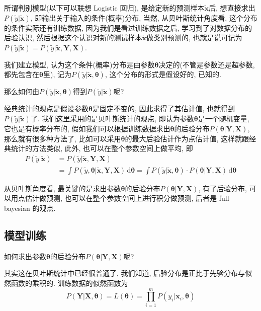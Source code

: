 \documentclass[a4paper,UTF8]{ctexart}
\theoremstyle{plain} \newtheorem{theorem}{定理}[section]
\theoremstyle{plain} \newtheorem{definition}{定义}[section]
\theoremstyle{plain} \newtheorem{lemma}{引理}[section]
\theoremstyle{plain} \newtheorem{proposition}{命题}[section]
\theoremstyle{plain} \newtheorem{example}{例}[section]
\theoremstyle{plain} \newtheorem{remark}{注}[section]
\theoremstyle{plain} \newtheorem{corollary}{推论}[section]
\newcommand\diff{\,{\mathrm d}} %
\begin{document}
所谓判别模型(以下可以联想 Logistic 回归), 是给定新的预测样本$\tilde{\bm{x}}$后, 想直接求出$P(\tilde{y} | \tilde{\bm{x}})$, 即输出关于输入的条件(概率)分布, 当然, 从贝叶斯统计角度看, 这个分布的条件实际还有训练数据, 因为我们是看过训练数据之后, 学习到了对数据分布的后验认识, 然后根据这个认识对新的测试样本$\tilde{\bm{x}}$做类别预测的, 也就是说可记为$P(\tilde{y} | \tilde{\bm{x}}) = P(\tilde{y} | \tilde{\bm{x}}, \bm{Y}, \bm{X})$.

我们建立模型, 认为这个条件(概率)分布是由参数$\bm{\theta}$决定的(不管是参数还是超参数, 都先包含在$\bm{\theta}$里), 记为$P(\tilde{y} | \tilde{\bm{x}}, \bm{\theta})$, 这个分布的形式是假设好的, 已知的.

那么如何由$P(\tilde{y} | \tilde{\bm{x}}, \bm{\theta})$得到$P(\tilde{y} | \tilde{\bm{x}})$呢? 

经典统计的观点是假设参数$\bm{\theta}$是固定不变的, 因此求得了其估计值, 也就得到$P(\tilde{y} | \tilde{\bm{x}})$了. 我们这里采用的是贝叶斯统计的观点, 即认为参数$\bm{\theta}$是一个随机变量, 它也是有概率分布的, 假如我们可以根据训练数据求出$\bm{\theta}$的后验分布$P(\bm{\theta} | \bm{Y}, \bm{X})$, 那么就有很多种方法了, 比如可以采用$\bm{\theta}$的最大后验估计作为点估计值, 这样就跟经典统计的方法类似, 此外, 也可以在整个参数空间上做平均, 即
\begin{align}
P(\tilde{y} | \tilde{\bm{x}}) & = P(\tilde{y} | \tilde{\bm{x}}, \bm{Y}, \bm{X}) \\ 
& = \int P(\tilde{y}, \bm{\theta} | \tilde{\bm{x}}, \bm{Y}, \bm{X}) \diff \bm{\theta} = \int P(\tilde{y} | \tilde{\bm{x}}, \bm{\theta}) \cdot P(\bm{\theta} | \bm{Y}, \bm{X}) \diff \bm{\theta}
\end{align}

从贝叶斯角度看, 最关键的是求出参数$\bm{\theta}$的后验分布$P(\bm{\theta} | \bm{Y}, \bm{X})$, 有了后验分布, 可以用点估计做预测, 也可以在整个参数空间上进行积分做预测, 后者是 full bayesian 的观点.


\subsection{模型训练}
如何求出参数$\bm{\theta}$的后验分布$P(\bm{\theta} | \bm{Y}, \bm{X})$呢?

其实这在贝叶斯统计中已经很普通了, 我们知道, 后验分布是正比于先验分布与似然函数的乘积的. 训练数据的似然函数为
\begin{equation}
P(\bm{Y} | \bm{X}, \bm{\theta}) = L(\bm{\theta}) = \prod_{i=1}^{m} P(y_i | \bm{x}_i, \bm{\theta})
\end{equation}
\end{document}
